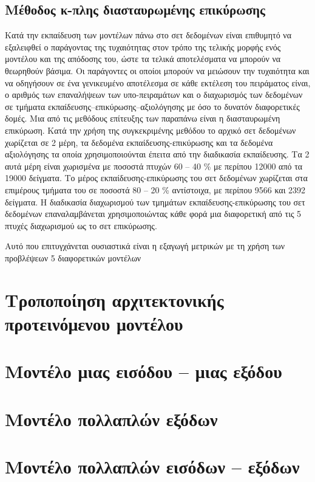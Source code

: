 \subsection{Μέθοδος κ-πλης διασταυρωμένης επικύρωσης}
Κατά την εκπαίδευση των μοντέλων πάνω στο σετ δεδομένων είναι επιθυμητό να εξαλειφθεί ο παράγοντας της τυχαιότητας στον τρόπο της τελικής μορφής ενός μοντέλου και της απόδοσης του, ώστε τα τελικά αποτελέσματα να μπορούν να θεωρηθούν βάσιμα.
Οι παράγοντες οι οποίοι μπορούν να μειώσουν την τυχαιότητα και να οδηγήσουν σε ένα γενικευμένο αποτέλεσμα σε κάθε εκτέλεση του πειράματος είναι, ο αριθμός των επαναλήψεων των υπο-πειραμάτων και ο διαχωρισμός των δεδομένων σε τμήματα εκπαίδευσης--επικύρωσης--αξιολόγησης με όσο το δυνατόν διαφορετικές δομές.
Μια από τις μεθόδους επίτευξης των παραπάνω είναι η διασταυρωμένη επικύρωση. Κατά την χρήση της συγκεκριμένης μεθόδου το αρχικό σετ δεδομένων χωρίζεται σε 2 μέρη, τα δεδομένα εκπαίδευσης-επικύρωσης και τα δεδομένα αξιολόγησης τα οποία χρησιμοποιούνται έπειτα από την διαδικασία εκπαίδευσης. Τα 2 αυτά μέρη είναι χωρισμένα με ποσοστά πτυχών 60 -- 40 \% με περίπου 12000 από τα 19000 δείγματα. Το μέρος εκπαίδευσης-επικύρωσης του σετ δεδομένων χωρίζεται στα επιμέρους τμήματα του σε ποσοστά 80 -- 20 \% αντίστοιχα, με περίπου 9566 και 2392 δείγματα.
Η διαδικασία διαχωρισμού των τμημάτων εκπαίδευσης-επικύρωσης του σετ δεδομένων επαναλαμβάνεται χρησιμοποιώντας κάθε φορά μια διαφορετική από τις 5 πτυχές διαχωρισμού ως το σετ επικύρωσης.

Αυτό που επιτυγχάνεται ουσιαστικά είναι η εξαγωγή μετρικών με τη χρήση των προβλέψεων 5 διαφορετικών μοντέλων

\section{Τροποποίηση αρχιτεκτονικής προτεινόμενου μοντέλου}

\section{Μοντέλο μιας εισόδου -- μιας εξόδου}

\section{Μοντέλο πολλαπλών εξόδων}

\section{Μοντέλο πολλαπλών εισόδων -- εξόδων}

